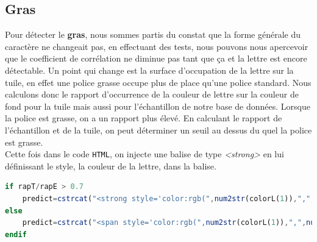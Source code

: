 \documentclass[a4paper,12pt,titlepage]{report}
\begin{document}
	\subsection{Gras}
	Pour détecter le \textbf{gras}, nous sommes partis du constat que la forme générale du caractère ne changeait pas, en effectuant des tests, nous pouvons nous apercevoir que le coefficient de corrélation ne diminue pas tant que ça et la lettre est encore détectable. Un point qui change est la surface d'occupation de la lettre sur la tuile, en effet une police grasse occupe plus de place qu'une police standard. Nous calculons donc le rapport d'occurrence de la couleur de lettre sur la couleur de fond pour la tuile mais aussi pour l'échantillon de notre base de données. Lorsque la police est grasse, on a un rapport plus élevé. En calculant le rapport de l’échantillon et de la tuile, on peut déterminer un seuil au dessus du quel la police est grasse.\\
	Cette fois dans le code \texttt{HTML}, on injecte une balise de type \textsl{<strong>} en lui définissant le style, la couleur de la lettre, dans la balise.
	\begin{lstlisting}[caption={Insertion d'une lettre grasse de la lettre dans Octave},language=Octave]
if rapT/rapE > 0.7
	predict=cstrcat("<strong style='color:rgb(",num2str(colorL(1)),",",num2str(colorL(2)),",",num2str(colorL(3)),");'>",predict,"</strong>");
else
	predict=cstrcat("<span style='color:rgb(",num2str(colorL(1)),",",num2str(colorL(2)),",",num2str(colorL(3)),");'>",predict,"</span>");
endif
\end{lstlisting}
\end{document}
